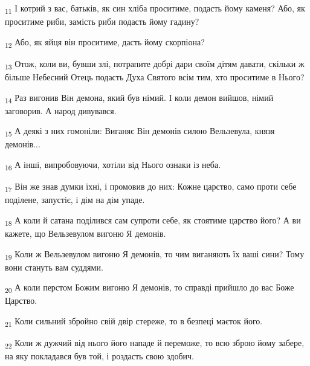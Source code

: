 \begin{tcolorbox}
\textsubscript{11} І котрий з вас, батьків, як син хліба проситиме, подасть йому каменя? Або, як проситиме риби, замість риби подасть йому гадину?
\end{tcolorbox}
\begin{tcolorbox}
\textsubscript{12} Або, як яйця він проситиме, дасть йому скорпіона?
\end{tcolorbox}
\begin{tcolorbox}
\textsubscript{13} Отож, коли ви, бувши злі, потрапите добрі дари своїм дітям давати, скільки ж більше Небесний Отець подасть Духа Святого всім тим, хто проситиме в Нього?
\end{tcolorbox}
\begin{tcolorbox}
\textsubscript{14} Раз вигонив Він демона, який був німий. І коли демон вийшов, німий заговорив. А народ дивувався.
\end{tcolorbox}
\begin{tcolorbox}
\textsubscript{15} А деякі з них гомоніли: Виганяє Він демонів силою Вельзевула, князя демонів...
\end{tcolorbox}
\begin{tcolorbox}
\textsubscript{16} А інші, випробовуючи, хотіли від Нього ознаки із неба.
\end{tcolorbox}
\begin{tcolorbox}
\textsubscript{17} Він же знав думки їхні, і промовив до них: Кожне царство, само проти себе поділене, запустіє, і дім на дім упаде.
\end{tcolorbox}
\begin{tcolorbox}
\textsubscript{18} А коли й сатана поділився сам супроти себе, як стоятиме царство його? А ви кажете, що Вельзевулом вигоню Я демонів.
\end{tcolorbox}
\begin{tcolorbox}
\textsubscript{19} Коли ж Вельзевулом вигоню Я демонів, то чим виганяють їх ваші сини? Тому вони стануть вам суддями.
\end{tcolorbox}
\begin{tcolorbox}
\textsubscript{20} А коли перстом Божим вигоню Я демонів, то справді прийшло до вас Боже Царство.
\end{tcolorbox}
\begin{tcolorbox}
\textsubscript{21} Коли сильний збройно свій двір стереже, то в безпеці маєток його.
\end{tcolorbox}
\begin{tcolorbox}
\textsubscript{22} Коли ж дужчий від нього його нападе й переможе, то всю зброю йому забере, на яку покладався був той, і роздасть свою здобич.
\end{tcolorbox}

